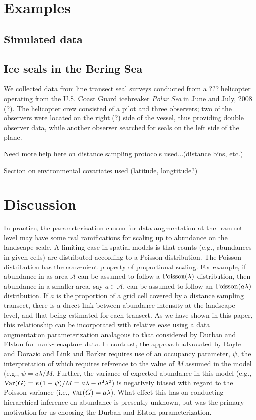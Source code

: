 \documentclass[10pt]{article}
\begin{document}
\section*{Examples}
\subsection*{Simulated data}
\subsection*{Ice seals in the Bering Sea}

We collected data from line transect seal surveys conducted from a ??? helicopter operating from the U.S. Coast Guard icebreaker {\it Polar Sea} in June and July, 2008 (?).  The helicopter crew consisted of a pilot and three observers; two of the observers were located on the right (?) side of the vessel, thus providing double observer data, while another observer searched for seals on the left side of the plane.

Need more help here on distance sampling protocols used...(distance bins, etc.)

Section on environmental covariates used (latitude, longtitude?)


\section*{Discussion}

In practice, the parameterization chosen for data augmentation at the transect level may have some real ramifications for scaling up to abundance on the landscape scale.  A limiting case in spatial models is that counts (e.g., abundances in given cells) are distributed according to a Poisson distribution.  The Poisson distribution has the convenient property of proportional scaling.  For example, if abundance in as area $\mathcal{A}$  can be assumed to follow a ${\rm Poisson}(\lambda)$ distribution, then abundance in a smaller area, say $a \in \mathcal{A}$, can be assumed to follow an ${\rm Poisson}(a\lambda)$ distribution.  If $a$ is the proportion of a grid cell covered by a distance sampling transect, there is a direct link between abundance intensity at the landscape level, and that being estimated for each transect.  As we have shown in this paper, this relationship can be incorporated with relative ease using a data augmentation parameterization analagous to that considered by Durban and Elston \cite{DurbanElston2005} for mark-recapture data. In contrast, the approach advocated by Royle and Dorazio \cite{RoyleDorazio2008} and Link and Barker \cite{LinkBarker2010} requires use of an occupancy parameter, $\psi$, the interpretation of which requires reference to the value of $M$ assumed in the model (e.g., $\psi=a\lambda/M$.  Further, the variance of expected abundance in this model (e.g., ${\rm Var}(G)=\psi (1-\psi)/M = a\lambda-a^2\lambda^2$) is negatively biased with regard to the Poisson variance (i.e., ${\rm Var}(G)=a\lambda$).  What effect this has on conducting hierarchical inference on abundance is presently unknown, but was the primary motivation for us choosing the Durban and Elston \cite{DurbanElston2005} parameterization.
\end{document}
